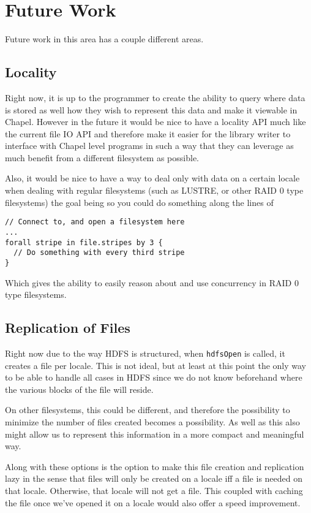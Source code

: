 \section{Future Work}\label{s:future}

Future work in this area has a couple different areas.

\subsection{Locality}

Right now, it is up to the programmer to create the ability to query where data is
stored as well how they wish to represent this data and make it viewable in Chapel.
However in the future it would be nice to have a locality API much like the current 
file IO API and therefore make it easier for the library writer to interface with Chapel 
level programs in such a way that they can leverage as much benefit from a different 
filesystem as possible. 

Also, it would be nice to have a way to deal only with data on a
certain locale when dealing with regular filesystems (such as LUSTRE, or other RAID 0
type filesystems) the goal being so you could do something along the lines of 
\begin{lstlisting}
// Connect to, and open a filesystem here
...
forall stripe in file.stripes by 3 {
  // Do something with every third stripe
}
\end{lstlisting}
Which gives the ability to easily reason about and use concurrency in RAID
0 type filesystems.

\subsection{Replication of Files}
Right now due to the way HDFS is structured, when {\tt hdfsOpen} is called, it creates a
file per locale. This is not ideal, but at least at this point the only way to be
able to handle all cases in HDFS since we do not know beforehand where the various
blocks of the file will reside.

On other filesystems, this could be different, and therefore the possibility to
minimize the number of files created becomes a possibility. As well as this also might
allow us to represent this information in a more compact and meaningful way. 

Along with these options is the option to make this file creation and replication
lazy in the sense that files will only be created on a locale iff a file is needed
on that locale. Otherwise, that locale will not get a file. This coupled with
caching the file once we've opened it on a locale would also offer a speed
improvement.

